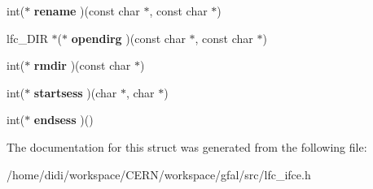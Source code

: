 \begin{DoxyCompactItemize}
\item 
int($\ast$ {\bfseries rename} )(const char $\ast$, const char $\ast$)\label{structfc__ops_adebb5a842bab0b9365a084ccf6d68bba}

\item 
lfc\_\-DIR $\ast$($\ast$ {\bfseries opendirg} )(const char $\ast$, const char $\ast$)\label{structfc__ops_af95ebfc81f3fb7a9d0a1b552c84744f9}

\item 
int($\ast$ {\bfseries rmdir} )(const char $\ast$)\label{structfc__ops_a233678dd8f7579e557d550dcab11ccd7}

\item 
int($\ast$ {\bfseries startsess} )(char $\ast$, char $\ast$)\label{structfc__ops_a88cd12ba8393bf77158071a1d16e9a7e}

\item 
int($\ast$ {\bfseries endsess} )()\label{structfc__ops_a7de00d253f98c28f161218fa13c053de}

\end{DoxyCompactItemize}


The documentation for this struct was generated from the following file:\begin{DoxyCompactItemize}
\item 
/home/didi/workspace/CERN/workspace/gfal/src/lfc\_\-ifce.h\end{DoxyCompactItemize}
